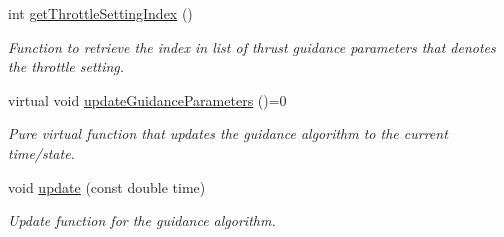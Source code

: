 \begin{DoxyCompactItemize}
int \hyperlink{classtudat_1_1simulation__setup_1_1ThrustInputParameterGuidance_ab04a76de5687a1621a08bb9bb4d26910}{get\+Throttle\+Setting\+Index} ()
\begin{DoxyCompactList}\small\item\em Function to retrieve the index in list of thrust guidance parameters that denotes the throttle setting. \end{DoxyCompactList}\item 
virtual void \hyperlink{classtudat_1_1simulation__setup_1_1ThrustInputParameterGuidance_ae929c1969241aea9408a5ac20c2f5216}{update\+Guidance\+Parameters} ()=0\hypertarget{classtudat_1_1simulation__setup_1_1ThrustInputParameterGuidance_ae929c1969241aea9408a5ac20c2f5216}{}\label{classtudat_1_1simulation__setup_1_1ThrustInputParameterGuidance_ae929c1969241aea9408a5ac20c2f5216}

\begin{DoxyCompactList}\small\item\em Pure virtual function that updates the guidance algorithm to the current time/state. \end{DoxyCompactList}\item 
void \hyperlink{classtudat_1_1simulation__setup_1_1ThrustInputParameterGuidance_a6354aa338fdcdbe8cf844011ec21e83f}{update} (const double time)
\begin{DoxyCompactList}\small\item\em Update function for the guidance algorithm. \end{DoxyCompactList}\end{DoxyCompactItemize}
